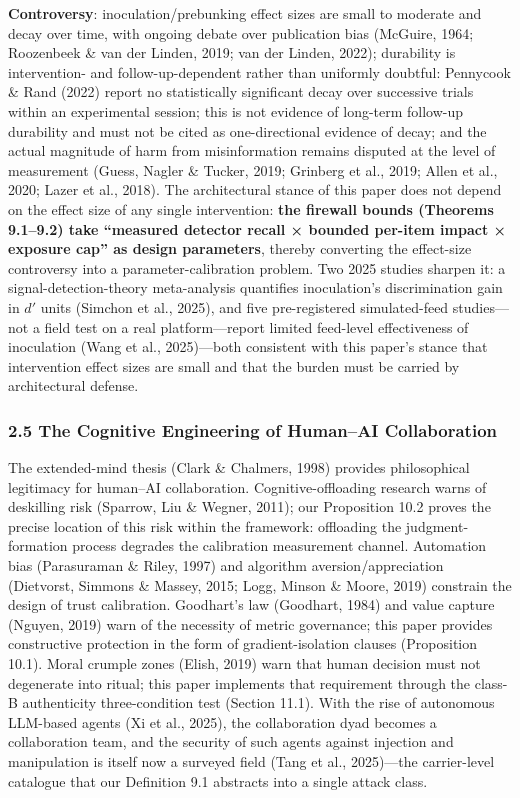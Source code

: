 \documentclass[
  11pt]{article}
\begin{document}
\textbf{Controversy}: inoculation/prebunking effect sizes are small to
moderate and decay over time, with ongoing debate over publication bias
(McGuire, 1964; Roozenbeek \& van der Linden, 2019; van der Linden,
2022); durability is intervention- and follow-up-dependent rather than
uniformly doubtful: Pennycook \& Rand (2022) report no statistically
significant decay over successive trials within an experimental session;
this is not evidence of long-term follow-up durability and must not be
cited as one-directional evidence of decay; and the actual magnitude of
harm from misinformation remains disputed at the level of measurement
(Guess, Nagler \& Tucker, 2019; Grinberg et al., 2019; Allen et al.,
2020; Lazer et al., 2018). The architectural stance of this paper does
not depend on the effect size of any single intervention: \textbf{the
firewall bounds (Theorems 9.1--9.2) take ``measured detector recall ×
bounded per-item impact × exposure cap'' as design parameters}, thereby
converting the effect-size controversy into a parameter-calibration
problem. Two 2025 studies sharpen it: a signal-detection-theory
meta-analysis quantifies inoculation's discrimination gain in \(d'\)
units (Simchon et al., 2025), and five pre-registered simulated-feed
studies---not a field test on a real platform---report limited
feed-level effectiveness of inoculation (Wang et al., 2025)---both
consistent with this paper's stance that intervention effect sizes are
small and that the burden must be carried by architectural defense.

\subsubsection{2.5 The Cognitive Engineering of Human--AI
Collaboration}\label{the-cognitive-engineering-of-humanai-collaboration}

The extended-mind thesis (Clark \& Chalmers, 1998) provides
philosophical legitimacy for human--AI collaboration.
Cognitive-offloading research warns of deskilling risk (Sparrow, Liu \&
Wegner, 2011); our Proposition 10.2 proves the precise location of this
risk within the framework: offloading the judgment-formation process
degrades the calibration measurement channel. Automation bias
(Parasuraman \& Riley, 1997) and algorithm aversion/appreciation
(Dietvorst, Simmons \& Massey, 2015; Logg, Minson \& Moore, 2019)
constrain the design of trust calibration. Goodhart's law (Goodhart,
1984) and value capture (Nguyen, 2019) warn of the necessity of metric
governance; this paper provides constructive protection in the form of
gradient-isolation clauses (Proposition 10.1). Moral crumple zones
(Elish, 2019) warn that human decision must not degenerate into ritual;
this paper implements that requirement through the class-B authenticity
three-condition test (Section 11.1). With the rise of autonomous
LLM-based agents (Xi et al., 2025), the collaboration dyad becomes a
collaboration team, and the security of such agents against injection
and manipulation is itself now a surveyed field (Tang et al.,
2025)---the carrier-level catalogue that our Definition 9.1 abstracts
into a single attack class.
\end{document}

